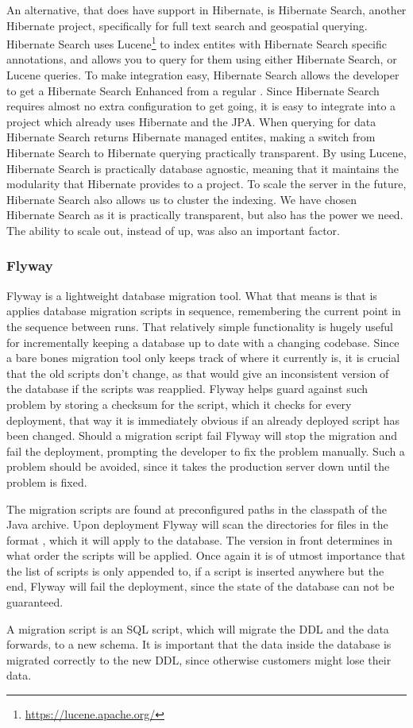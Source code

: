 An alternative, that does have support in Hibernate, is Hibernate Search, another Hibernate project, specifically for full text search and geospatial querying.
Hibernate Search uses Lucene\footnote{\url{https://lucene.apache.org/}} to index entites with Hibernate Search specific annotations, and allows you to query for them using either Hibernate Search, or Lucene queries.
To make integration easy, Hibernate Search allows the developer to get a Hibernate Search Enhanced  from a regular .
Since Hibernate Search requires almost no extra configuration to get going, it is easy to integrate into a project which already uses Hibernate and the \ac{JPA}.
When querying for data Hibernate Search returns Hibernate managed entites, making a switch from Hibernate Search to Hibernate querying practically transparent.
By using Lucene, Hibernate Search is practically database agnostic, meaning that it maintains the modularity that Hibernate provides to a project.
To scale the server in the future, Hibernate Search also allows us to cluster the indexing.
We have chosen Hibernate Search as it is practically transparent, but also has the power we need.
The ability to scale out, instead of up, was also an important factor.


\subsubsection{Flyway}
Flyway is a lightweight database migration tool.
What that means is that is applies database migration scripts in sequence, remembering the current point in the sequence between runs.
That relatively simple functionality is hugely useful for incrementally keeping a database up to date with a changing codebase.
Since a bare bones migration tool only keeps track of where it currently is, it is crucial that the old scripts don't change, as that would give an inconsistent version of the database if the scripts was reapplied.
Flyway helps guard against such problem by storing a checksum for the script, which it checks for every deployment, that way it is immediately obvious if an already deployed script has been changed.
Should a migration script fail Flyway will stop the migration and fail the deployment, prompting the developer to fix the problem manually.
Such a problem should be avoided, since it takes the production server down until the problem is fixed.

The migration scripts are found at preconfigured paths in the classpath of the Java archive.
Upon deployment Flyway will scan the directories for files in the format , which it will apply to the database.
The version in front determines in what order the scripts will be applied.
Once again it is of utmost importance that the list of scripts is only appended to, if a script is inserted anywhere but the end, Flyway will fail the deployment, since the state of the database can not be guaranteed.

A migration script is an SQL script, which will migrate the \ac{DDL} and the data forwards, to a new schema.
It is important that the data inside the database is migrated correctly to the new \ac{DDL}, since otherwise customers might lose their data.
